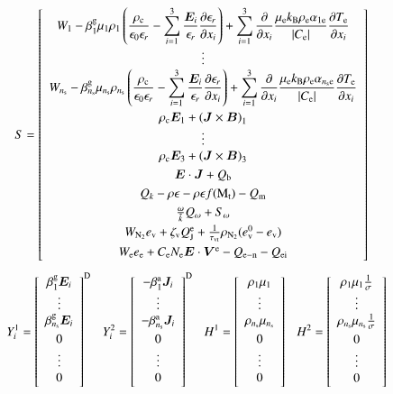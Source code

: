 \documentclass{warpdoc}
\newcommand{\alb}{\vspace{0.1cm}\\} %
\newcommand{\mfd}{\displaystyle}
\newcommand{\ns}{{n_{\rm s}}}
\renewcommand{\vec}[1]{\bm{#1}}
\begin{document}
%
%
\begin{equation}
S = \left[ \begin{array}{c}\mfd
W_1 
-\beta_1^{\rm g} \mu_1 \rho_1 \left(
  \frac{\rho_{\rm c}}{\epsilon_0\epsilon_r}
  -\sum_{i=1}^3 \frac{\vec{E}_i}{\epsilon_r} \frac{\partial \epsilon_r}{\partial x_i}  
\right)
+\sum_{i=1}^3 \frac{\partial}{\partial x_i} \frac{\mu_{\rm e} k_{\rm B}\rho_{\rm e} \alpha_{1{\rm e}}}{|C_{\rm e}|}\frac{\partial T_{\rm e}}{\partial x_i} \\
\vdots \\ \mfd
W_\ns 
-\beta_\ns^{\rm g} \mu_\ns \rho_\ns \left(
  \frac{\rho_{\rm c}}{\epsilon_0\epsilon_r}
  -\sum_{i=1}^3 \frac{\vec{E}_i}{\epsilon_r} \frac{\partial \epsilon_r}{\partial x_i}  
\right)
+\sum_{i=1}^3 \frac{\partial}{\partial x_i} \frac{\mu_{\rm e} k_{\rm B}\rho_{\rm e} \alpha_{\ns {\rm e}}}{|C_{\rm e}|}\frac{\partial T_{\rm e}}{\partial x_i}\alb
\rho_{\rm c} \vec{E}_1 + \left(\vec{J}\times\vec{B} \right)_1\\
\vdots\\
\rho_{\rm c} \vec{E}_3 + \left(\vec{J}\times\vec{B} \right)_3\alb
\vec{E}\cdot\vec{J}+Q_{\rm b}\alb
Q_k -\rho \epsilon -\rho\epsilon f({\rm M}_{\rm t})-Q_{\rm m} \alb
\frac{\omega}{\tilde{k}} Q_\omega + S_\omega  \alb
W_{\rm N_2} e_{\rm v} + \zeta_{\rm v} Q_{\rm J}^{\rm e} + \frac{1}{\tau_{\rm vt}} \rho_{\rm N_2}(e_{\rm v}^0 - e_{\rm v}) \alb
W_{\rm e} e_{\rm e} +   C_{\rm e} N_{\rm e} \vec{E} \cdot \vec{V}^{\rm e}  - Q_{\rm e-n} - Q_{\rm ei}\alb
\end{array}
\right]
\end{equation}
%
%
\begin{equation}
~~~
~~~
Y_i^1 = \left[ \begin{array}{c}
\beta_1^{\rm g}\vec{E}_i  \\
\vdots \\
\beta_\ns^{\rm g}\vec{E}_i  \alb
0 \\
\vdots \\
0 \alb
\end{array}
\right]^{\rm D}
~~~
Y_i^2 = \left[ \begin{array}{c}
 - \beta_1^{\rm a} \vec{J}_i \\
\vdots \\
 - \beta_\ns^{\rm a} \vec{J}_i \alb
0 \\
\vdots \\
0 \alb
\end{array}
\right]^{\rm D}
~~~
H^1 = \left[ \begin{array}{c}
\rho_1 \mu_1  \\
\vdots \\
\rho_\ns \mu_\ns  \alb
0 \\
\vdots \\
0 \alb
\end{array}
\right]
~~~
H^2 = \left[ \begin{array}{c}
\rho_1 \mu_1 \frac{1}{\sigma}    \\
\vdots \\
\rho_\ns \mu_\ns \frac{1}{\sigma}    \alb
0 \\
\vdots \\
0 \alb
\end{array}
\right]
~~~
\end{equation}
\end{document}
